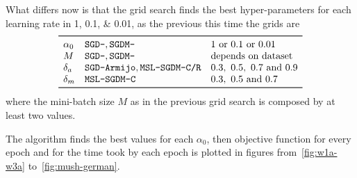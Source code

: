 What differs now is that the grid search finds the best hyper-parameters for each learning rate in \numlist{1; 0.1; 0.01}, as the previous this time the grids are
\[
\begin{array}{lll}
\toprule
\alpha_0 & \text{\texttt{SGD-}}, \text{\texttt{SGDM-}} & \text{\num{1} or \num{0.1} or \num{0.01}} \\
M & \text{\texttt{SGD-}}, \text{\texttt{SGDM-}} & \text{depends on dataset} \\
\delta_a & \text{\texttt{SGD-Armijo}}, \text{\texttt{MSL-SGDM-C/R}} & \numlist{0.3; 0.5; 0.7; 0.9} \\
\delta_m & \text{\texttt{MSL-SGDM-C}} & \numlist{0.3; 0.5; 0.7} \\
\bottomrule
\end{array}
\]
where the mini-batch size $M$ as in the previous grid search is composed by at least two values.

The algorithm finds the best values for each $\alpha_0$, then objective function for every epoch and for the time took by each epoch is plotted in figures from~\vref{fig:w1a-w3a} to~\ref{fig:mush-german}.




